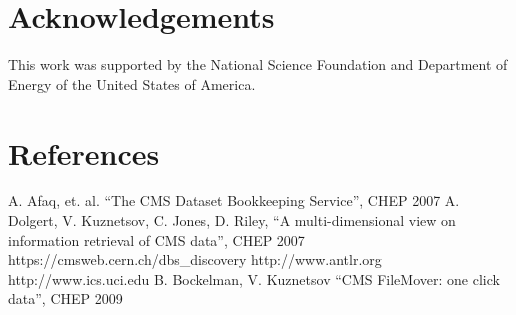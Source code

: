 \documentclass[a4paper]{jpconf}
\begin{document}
\section{Acknowledgements}

This work was supported by the National Science Foundation and Department of Energy of the United States of America.

\section*{References}
\begin{thebibliography}{9}
 A. Afaq, et. al. ``The CMS Dataset Bookkeeping Service'', CHEP 2007 
 A. Dolgert, V. Kuznetsov, C. Jones, D. Riley, 
``A multi-dimensional view on information retrieval of CMS data'', CHEP 2007
 https://cmsweb.cern.ch/dbs\_discovery
 http://www.antlr.org
 http://www.ics.uci.edu
 B. Bockelman, V. Kuznetsov ``CMS FileMover: one click data'', CHEP 2009

\end{thebibliography}
\end{document}
